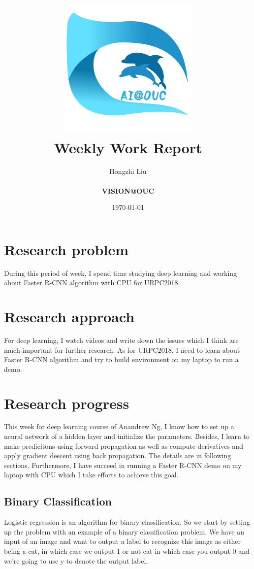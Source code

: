 \documentclass[a4paper]{article}
\title{
    \vspace*{1in}
    \includegraphics[width=2.75in]{figures/zhenglab-logo} \\
    \vspace*{1.2in}
    \textbf{\huge Weekly Work Report}
    \vspace{0.2in}
}
\author{Hongzhi Liu \\
    \vspace*{0.5in} \\
    \textbf{VISION@OUC} \\
    \vspace*{1in}
}
\date{\today}
\begin{document}
\par
\maketitle
\setcounter{page}{0}
\thispagestyle{empty}
\newpage


\section{Research problem}

During this period of week, I spend time studying deep learning and working about Faster R-CNN algorithm with CPU for URPC2018.

\section{Research approach}

For deep learning, I watch videos and write down the issues which I think are much important for further research. As for URPC2018, I need to learn about Faster R-CNN algorithm \cite{Ren2015Faster} and try to build environment on my laptop to run a demo.

\section{Research progress}

This week for deep learning course of Anandrew Ng, I know how to set up a neural network of a hidden layer and initialize the parameters. Besides, I learn to make predicitons using forward propagation as well as compute derivatives and apply gradient descent using back propagation. The details are in following sections. Furthermore, I have succeed in running a Faster R-CNN demo on my laptop with CPU which I take efforts to achieve this goal. 

\subsection{Binary Classification}

Logistic regression is an algorithm for binary classification. So we start by setting up the problem with an example of a binary classification problem. We have an input of an image and want to output a label to recognize this image as either being a cat, in which case we output 1 or not-cat in which case you output 0 and we're going to use y to denote the output label.
\end{document}
